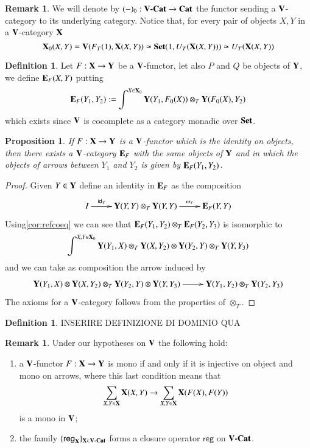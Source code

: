 \documentclass[12pt]{article}
\newtheorem{proposition}[lemma]{Proposition}
\theoremstyle{definition}
\newtheorem{definition}[lemma]{Definition}
\newtheorem{remark}[lemma]{Remark}
\newcommand{\Set}{\textbf{\textup{Set}}}
\newcommand{\Cat}{\textbf{\textup{Cat}}}
\numberwithin{equation}{section}
\newcommand{\id}[1]{\mathsf{id}_{#1}}
\def\reg{\mathsf{reg}}
\newcommand{\vcat}{\V\textbf{\textup{-Cat}}}
\def\X{\textbf {\textup{X}}}
\def\V{\textbf {\textup{V}}}
\def\Y{\textbf {\textup{Y}}}
\def\e{\textbf {\textup{E}}}
\begin{document}
	\begin{remark}We will denote by  $(-)_0:\vcat\to \Cat$ the functor sending a $\V$-category to its underlying category. Notice that, for every pair of objects $X, Y$  in a $\V$-category $\X$
	\[\X_0(X,Y)=\V(F_T(1), \X(X,Y) )\simeq\Set(1, U_T(\X(X,Y)))\simeq U_T(\X(X,Y))\]	
	\end{remark}
	\begin{definition}
		Let $F:\X\to \Y$ be a $\V$-functor, let also $P$ and $Q$ be objects of $\Y$, we define $\e_F(X, Y) $ putting
		\[\e_F(Y_1, Y_2):=\int^{X\in \X_0} \Y(Y_1, F_0(X)) \otimes_T \Y(F_0(X), Y_2)\]
		which exists since $\V$ is cocomplete as a category monadic over $\Set$.
	\end{definition}

\begin{proposition}\label{prop:comp}
	If $F:\X \to \Y$ is a $\V$-functor which is the identity on objects, then there exists a $\V$-category $\e_F$  with the same objects of $\Y$ and in which the objects of arrows between $Y_1$ and $Y_2$ is given by $\e_F(Y_1, Y_2)$. 
 \end{proposition}
\begin{proof}
Given $Y\in \Y$ define an identity in $\e_F$ as the composition
\[\xymatrix{I \ar[r]^-{\id{Y}}& \Y(Y,Y) \otimes_T \Y(Y,Y)\ar[r]^-{\omega_Y} &\e_F(Y, Y)}\] 
Using\ref{cor:refcoeq} we can see that $\e_F(Y_1, Y_2)\otimes_T \e_F(Y_2, Y_3)$ is isomorphic to
\[\int^{X, Y\in \X_0} \Y(Y_1, X)\otimes_T \Y(X, Y_2)\otimes \Y(Y_2, Y)\otimes_T \Y(Y, Y_3)\]
and we can take as composition the arrow induced by
\[\xymatrix{\Y(Y_1, X)\otimes \Y(X, Y_2)\otimes_T \Y(Y_2, Y)\otimes \Y(Y, Y_3) \ar[r] & \Y(Y_1, Y_2)\otimes_T \Y(Y_2, Y_3)}  \]
The axioms for a $\V$-category follows from the properties of $\otimes_T$.
\end{proof}

\begin{definition}
	
	INSERIRE DEFINIZIONE DI DOMINIO QUA
\end{definition}

\begin{remark}
	Under our hypotheses on $\V$ the following hold:
	\begin{enumerate}
		\item a $\V$-functor $F:\X\to \Y$ is mono if and only if it is injective on object and mono on arrows, where this last condition means that
		\[\sum_{X, Y\in \X} \X(X,Y)\to \sum_{X, Y\in \X} \X(F(X),F(Y)) \]
		is a mono in $\V$;
		\item the family $\{\reg_{\X}\}_{\X\in \vcat}$ forms a closure operator $\reg$ on $\vcat$.
	\end{enumerate}
\end{remark}
\end{document}
